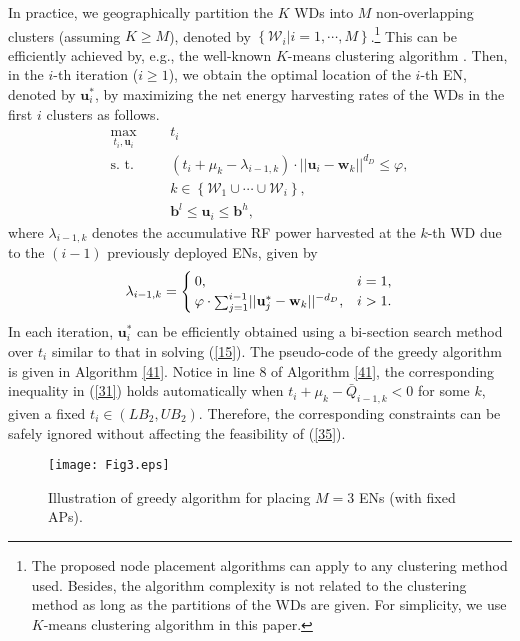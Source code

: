 \documentclass[journal, draftcls, one column, 12pt]{IEEEtran}
\begin{document}
In practice, we geographically partition the $K$ WDs into $M$ non-overlapping clusters (assuming $K\geq M$), denoted by $\left\{\mathcal{W}_i| i=1,\cdots,M\right\}$.\footnote{The proposed node placement algorithms can apply to any clustering method used. Besides, the algorithm complexity is not related to the clustering method as long as the partitions of the WDs are given. For simplicity, we use $K$-means clustering algorithm in this paper.} This can be efficiently achieved by, e.g., the well-known $K$-means clustering algorithm \cite{2006:Bishop}. Then, in the $i$-th iteration ($i\geq 1$), we obtain the optimal location of the $i$-th EN, denoted by $\mathbf{u}_i^*$, by maximizing the net energy harvesting rates of the WDs in the first $i$ clusters as follows.
\begin{subequations}
\label{35}
   \begin{align}
    \underset{t_i,\mathbf{u}_i}{\text{max}}&  & &  t_i\\
    \text{s. t.}&     & & \left(t_i+ \mu_k - \lambda_{i-1,k}\right) \cdot ||\mathbf{u}_i - \mathbf{w}_k||^{d_D} \leq \varphi,  \nonumber \\
    & & & k\in \left\{\mathcal{W}_1 \cup \cdots \cup \mathcal{W}_i\right\}, \label{31}\\
    & & & \mathbf{b}^l\leq \mathbf{u}_i\leq \mathbf{b}^h,
   \end{align}
\end{subequations}
where $\lambda_{i-1,k}$ denotes the accumulative RF power harvested at the $k$-th WD due to the $(i-1)$ previously deployed ENs, given by
\begin{equation}
\label{53}
\lambda_{i-1,k} = \begin{cases}
0, & i=1,\\
\varphi \cdot \mathsmaller\sum_{j=1}^{i-1} ||\mathbf{u}_j^* - \mathbf{w}_k||^{-d_D}, & i>1.
\end{cases}
\end{equation}
In each iteration, $\mathbf{u}_i^*$ can be efficiently obtained using a bi-section search method over $t_i$ similar to that in solving (\ref{15}). The pseudo-code of the greedy algorithm is given in Algorithm \ref{41}. Notice in line $8$ of Algorithm \ref{41}, the corresponding inequality in (\ref{31}) holds automatically when $t_i + \mu_k - \bar{Q}_{i-1,k}<0$ for some $k$, given a fixed $t_i\in\left(LB_2,UB_2\right)$. Therefore, the corresponding constraints can be safely ignored without affecting the feasibility of (\ref{35}).

\begin{figure}
\centering
  \begin{center}
    \texttt{[image: Fig3.eps]}
  \end{center}
  \caption{Illustration of greedy algorithm for placing $M=3$ ENs (with fixed APs).}
  \label{63}
\end{figure}
\end{document}
